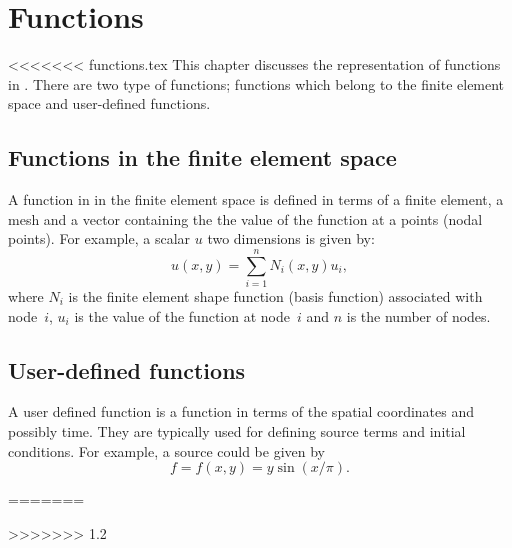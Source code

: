 \chapter{Functions}

<<<<<<< functions.tex
This chapter discusses the representation of functions in \dolfin{}. There are two type of functions; functions which belong to the finite element space and user-defined functions.



\section{Functions in the finite element space}
%
A function in in the finite element space is defined in terms of a finite element, a mesh and a vector containing the the value of the function at a points (nodal points). For example, a scalar $u$ two dimensions is given by:
\begin{equation}
  u(x,y) = \sum_{i=1}^{n} N_{i}(x,y) u_{i},
\end{equation}
where $N_{i}$ is the finite element shape function (basis function) associated with 
node~$i$, $u_{i}$ is the value of the function at node~$i$ and $n$ is the number of nodes.


\section{User-defined functions}
%
A user defined function is a function in terms of the spatial coordinates and possibly time. They are typically used for defining source terms and initial conditions. For example, a source could be given by
\begin{equation}
  f = f(x,y) = y \sin(x / \pi).
\end{equation}

=======

>>>>>>> 1.2
